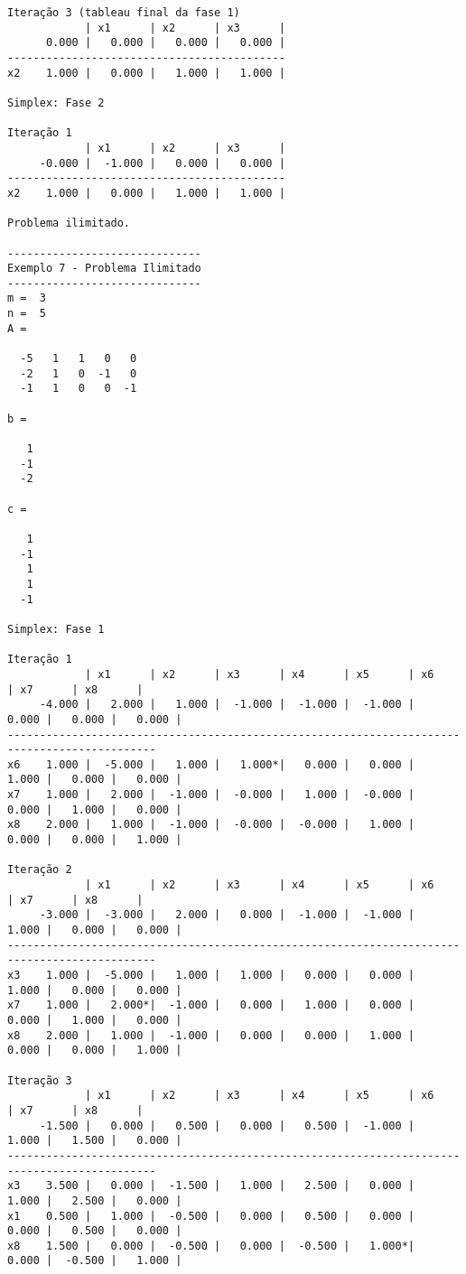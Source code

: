 \documentclass[12pt,a4paper]{article}
\begin{document}
\begin{tiny}
\begin{verbatim}
Iteração 3 (tableau final da fase 1)
            | x1      | x2      | x3      |
      0.000 |   0.000 |   0.000 |   0.000 |
-------------------------------------------
x2    1.000 |   0.000 |   1.000 |   1.000 |

Simplex: Fase 2

Iteração 1
            | x1      | x2      | x3      |
     -0.000 |  -1.000 |   0.000 |   0.000 |
-------------------------------------------
x2    1.000 |   0.000 |   1.000 |   1.000 |

Problema ilimitado.

------------------------------
Exemplo 7 - Problema Ilimitado
------------------------------
m =  3
n =  5
A =

  -5   1   1   0   0
  -2   1   0  -1   0
  -1   1   0   0  -1

b =

   1
  -1
  -2

c =

   1
  -1
   1
   1
  -1

Simplex: Fase 1

Iteração 1
            | x1      | x2      | x3      | x4      | x5      | x6      | x7      | x8      |
     -4.000 |   2.000 |   1.000 |  -1.000 |  -1.000 |  -1.000 |   0.000 |   0.000 |   0.000 |
---------------------------------------------------------------------------------------------
x6    1.000 |  -5.000 |   1.000 |   1.000*|   0.000 |   0.000 |   1.000 |   0.000 |   0.000 |
x7    1.000 |   2.000 |  -1.000 |  -0.000 |   1.000 |  -0.000 |   0.000 |   1.000 |   0.000 |
x8    2.000 |   1.000 |  -1.000 |  -0.000 |  -0.000 |   1.000 |   0.000 |   0.000 |   1.000 |

Iteração 2
            | x1      | x2      | x3      | x4      | x5      | x6      | x7      | x8      |
     -3.000 |  -3.000 |   2.000 |   0.000 |  -1.000 |  -1.000 |   1.000 |   0.000 |   0.000 |
---------------------------------------------------------------------------------------------
x3    1.000 |  -5.000 |   1.000 |   1.000 |   0.000 |   0.000 |   1.000 |   0.000 |   0.000 |
x7    1.000 |   2.000*|  -1.000 |   0.000 |   1.000 |   0.000 |   0.000 |   1.000 |   0.000 |
x8    2.000 |   1.000 |  -1.000 |   0.000 |   0.000 |   1.000 |   0.000 |   0.000 |   1.000 |

Iteração 3
            | x1      | x2      | x3      | x4      | x5      | x6      | x7      | x8      |
     -1.500 |   0.000 |   0.500 |   0.000 |   0.500 |  -1.000 |   1.000 |   1.500 |   0.000 |
---------------------------------------------------------------------------------------------
x3    3.500 |   0.000 |  -1.500 |   1.000 |   2.500 |   0.000 |   1.000 |   2.500 |   0.000 |
x1    0.500 |   1.000 |  -0.500 |   0.000 |   0.500 |   0.000 |   0.000 |   0.500 |   0.000 |
x8    1.500 |   0.000 |  -0.500 |   0.000 |  -0.500 |   1.000*|   0.000 |  -0.500 |   1.000 |


\end{verbatim}
\end{tiny}
\end{document}
